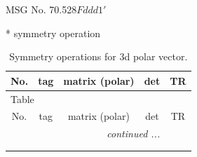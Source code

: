 \documentclass[fleqn,8pt]{jsarticle}
\begin{document}
\setcounter{MaxMatrixCols}{32}

\renewcommand{\tablename}{Table~}
\renewcommand{\figurename}{Figure~}
\begin{center}
\LARGE
MSG No. 70.528\quad$Fddd1'$
\end{center}
* symmetry operation
\renewcommand{\arraystretch}{1.3}
\begin{longtable}{ccccc}
\caption{Symmetry operations for 3d polar vector.}
 \\
 \hline \hline
No. & tag & matrix (polar) & det & TR \\ \hline \endfirsthead

\multicolumn{4}{l}{\tablename\ \thetable{}} \\
 \hline \hline
No. & tag & matrix (polar) & det & TR \\ \hline \endhead

 \hline \hline
\multicolumn{4}{r}{\footnotesize\it continued ...} \\ \endfoot

 \hline \hline
\multicolumn{4}{r}{} \\ \endlastfoot


\end{longtable}
\end{document}
